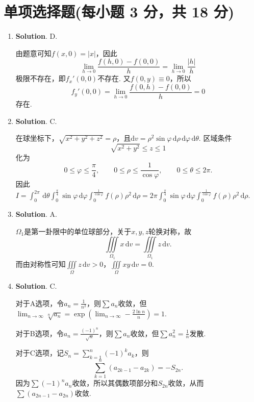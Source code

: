 \documentclass[../main.tex]{subfiles}
\begin{document}
\section{单项选择题(每小题 3 分，共 18 分)}
\begin{enumerate}
    \item \textbf{Solution}. D.

          由题意可知$f(x,0)=|x|$，因此
          \[
              \lim_{h\to0}\frac{f(h,0)-f(0,0)}{h}=\lim_{h\to0}\frac{|h|}{h}
          \]
          极限不存在，即$f_x'(0,0)$不存在. 又$f(0,y)\equiv0$，所以
          \[
              f_y'(0,0)=\lim_{h\to0}\frac{f(0,h)-f(0,0)}{h}=0
          \]
          存在.

    \item \textbf{Solution}. C.

          在球坐标下，$\sqrt{x^2+y^2+z^2}=\rho$，且$\mathrm{d}v=\rho^2\sin\varphi\,\mathrm{d}\rho\,\mathrm{d}\varphi\,\mathrm{d}\theta$. 区域条件
          \[
              \sqrt{x^2+y^2}\le z\le1
          \]
          化为
          \[
              0\le\varphi\le\frac{\pi}{4},\qquad 0\le\rho\le\frac{1}{\cos\varphi},\qquad 0\le\theta\le2\pi.
          \]
          因此$I=\int_{0}^{2\pi}\,\mathrm{d}\theta\int_0^{\frac{\pi}{4}}\sin\varphi\,\mathrm{d}\varphi\int_0^{\frac{1}{\cos\varphi}}f(\rho)\rho^2\,\mathrm{d}\rho=2\pi\int_0^{\frac{\pi}{4}}\sin\varphi\,\mathrm{d}\varphi\int_0^{\frac{1}{\cos\varphi}}f(\rho)\rho^2\,\mathrm{d}\rho$.

    \item \textbf{Solution}. A.

          $\Omega_1$是第一卦限中的单位球部分，关于$x,y,z$轮换对称，故
          \[
              \iiint\limits_{\Omega_1}x\,\mathrm{d}v=\iiint\limits_{\Omega_1}z\,\mathrm{d}v.
          \]
          而由对称性可知$\iiint\limits_\Omega z\,\mathrm{d}v>0$，$\iiint\limits_\Omega xy\,\mathrm{d}v=0$.

    \item \textbf{Solution}. C.

          对于A选项，令$a_n=\frac{1}{n^2}$，则$\sum a_n$收敛，但$\lim_{n\to\infty}\sqrt[n]{a_n}=\exp\left(\lim_{n\to\infty}-\frac{2\ln n}{n}\right)=1$.

          对于B选项，令$a_n=\frac{(-1)^n}{\sqrt{n}}$，则$\sum a_n$收敛，但$\sum a_n^2=\frac{1}{n}$发散.

          对于C选项，记$S_n=\sum_{k=1}^n(-1)^ka_k$，则
          \[
              \sum_{k=1}^n(a_{2k-1}-a_{2k})=-S_{2n}.
          \]
          因为$\sum(-1)^na_n$收敛，所以其偶数项部分和$S_{2n}$收敛，从而$\sum(a_{2n-1}-a_{2n})$收敛.


\end{enumerate}
\end{document}
